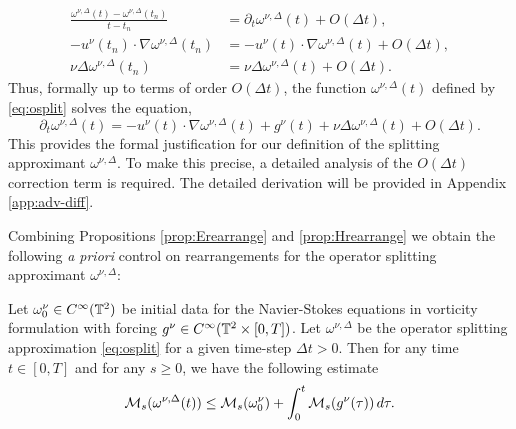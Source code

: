 \documentclass[reqno,12pt]{amsart}
\begin{document}
\begin{remark}
\begin{align*}
\frac{\omega^{\nu,\Delta}(t) - \omega^{\nu,\Delta}(t_n)}{t-t_n}
&= \partial_t \omega^{\nu,\Delta}(t) + O(\Delta t),
\\
-u^\nu(t_n) \cdot \nabla  \omega^{\nu,\Delta}(t_{n})
&= -u^\nu(t)\cdot \nabla  \omega^{\nu,\Delta}(t) + O(\Delta t),
\\
\nu \Delta \omega^{\nu,\Delta}(t_n)
&= \nu \Delta \omega^{\nu,\Delta}(t) + O(\Delta t).
\end{align*}
Thus, formally up to terms of order $O(\Delta t)$, the function $\omega^{\nu,\Delta}(t)$ defined by \eqref{eq:osplit} solves the equation,
\[
\partial_t \omega^{\nu,\Delta}(t) = -u^\nu(t) \cdot \nabla \omega^{\nu,\Delta}(t) + g^\nu(t) + \nu \Delta \omega^{\nu,\Delta}(t)
+ O(\Delta t).
\]
This provides the formal justification for our definition of the splitting approximant $\omega^{\nu,\Delta}$. To make this precise, a detailed analysis of the $O(\Delta t)$ correction term is required. The detailed derivation will be provided in Appendix \ref{app:adv-diff}.
\end{remark}




  Combining Propositions \ref{prop:Erearrange} and \ref{prop:Hrearrange} we obtain the following {\it a priori} control on rearrangements for the operator splitting approximant $\omega^{\nu,\Delta}$:

\begin{lemma}
\label{lem:rearrange}
Let $\omega^\nu_0 \in C^\infty(\mathbb{T}^2)$ be initial data for the Navier-Stokes equations in vorticity formulation with forcing $g^\nu \in C^\infty(\mathbb{T}^2\times [0,T])$. Let $\omega^{\nu,\Delta}$ be the operator splitting approximation \eqref{eq:osplit} for a given time-step $\Delta t>0$. Then for any time $t\in [0,T]$ and for any $s\ge 0$, we have the following estimate
\begin{align}
\label{eq:rearrange}
\mathcal{M}_s (\omega^{\nu,\Delta}(t))
\le
\mathcal{M}_s (\omega^\nu_0)
+
\int_0^t \mathcal{M}_s (g^\nu(\tau)) \, d\tau.
\end{align}
\end{lemma}
\end{document}
